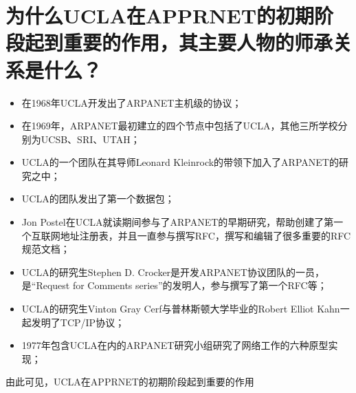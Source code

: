\documentclass[12pt,letterpaper]{article}
\begin{document}
\section{为什么UCLA在APPRNET的初期阶段起到重要的作用，其主要人物的师承关系是什么？}
\begin{itemize}
	\item 在1968年UCLA开发出了ARPANET主机级的协议；
	\item 在1969年，ARPANET最初建立的四个节点中包括了UCLA，其他三所学校分别为UCSB、SRI、UTAH；
	\item UCLA的一个团队在其导师Leonard Kleinrock的带领下加入了ARPANET的研究之中；
	\item UCLA的团队发出了第一个数据包；
	\item Jon Postel在UCLA就读期间参与了ARPANET的早期研究，帮助创建了第一个互联网地址注册表，并且一直参与撰写RFC，撰写和编辑了很多重要的RFC规范文档；
	\item UCLA的研究生Stephen D. Crocker是开发ARPANET协议团队的一员，是“Request for Comments series”的发明人，参与撰写了第一个RFC等；
	\item UCLA的研究生Vinton Gray Cerf与普林斯顿大学毕业的Robert Elliot Kahn一起发明了TCP/IP协议；
	\item 1977年包含UCLA在内的ARPANET研究小组研究了网络工作的六种原型实现；
	
\end{itemize}
由此可见，UCLA在APPRNET的初期阶段起到重要的作用
\end{document}
